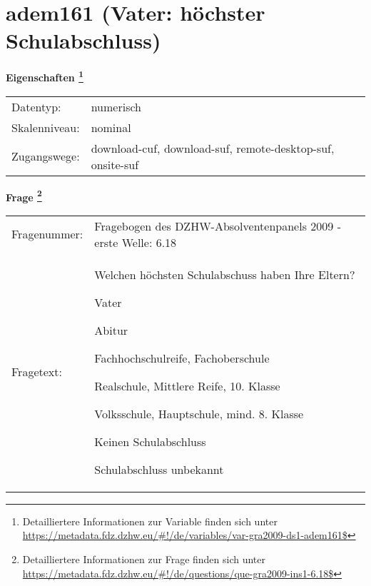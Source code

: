 
    \setcounter{footnote}{0}

    \vspace*{-1.8cm}
	\section{adem161 (Vater: höchster Schulabschluss)}
	\label{section:adem161}



    \vspace*{0.5cm}
    \noindent\textbf{Eigenschaften
	\footnote{Detailliertere Informationen zur Variable finden sich unter
		\url{https://metadata.fdz.dzhw.eu/\#!/de/variables/var-gra2009-ds1-adem161$}}}\\
	\begin{tabularx}{\hsize}{@{}lX}
	Datentyp: & numerisch \\
	Skalenniveau: & nominal \\
	Zugangswege: &
	  download-cuf, 
	  download-suf, 
	  remote-desktop-suf, 
	  onsite-suf
 \\
    \end{tabularx}



				\vspace*{0.5cm}
                \noindent\textbf{Frage
	                \footnote{Detailliertere Informationen zur Frage finden sich unter
		              \url{https://metadata.fdz.dzhw.eu/\#!/de/questions/que-gra2009-ins1-6.18$}}}\\
				\begin{tabularx}{\hsize}{@{}lX}
					Fragenummer: &
					  Fragebogen des DZHW-Absolventenpanels 2009 - erste Welle:
					  6.18
 \\
					Fragetext: & Welchen höchsten Schulabschuss haben Ihre Eltern?\par  Vater\par  Abitur\par  Fachhochschulreife, Fachoberschule\par  Realschule, Mittlere Reife, 10. Klasse\par  Volksschule, Hauptschule, mind. 8. Klasse\par  Keinen Schulabschluss\par  Schulabschluss unbekannt \\
				\end{tabularx}





